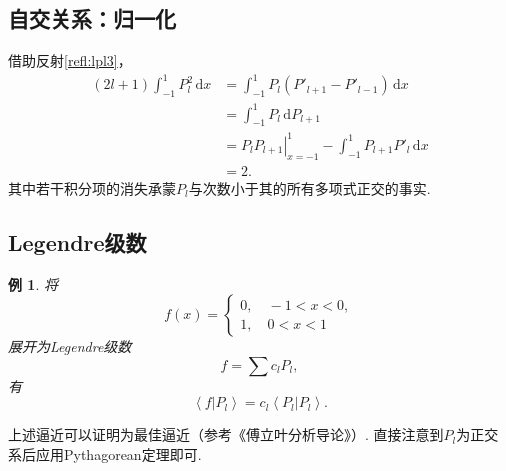\documentclass[UTF-8]{ctexart}
\newcommand{\dr}{\mathrm{d}}
\newcommand{\pare}[1]{\left(#1\right)}
\newcommand{\intab}[4]{\int_{#1}^{#2} #3 \, \dr #4}
\newcommand{\blk}[2]{\left\langle#1\right\vert#2\left.\right\rangle}
\newtheorem{reflection}{反射}
\newcommand{\refl}[1]{\vspace{0.5em}\par\noindent\fbox{%
    \parbox{\textwidth}{%
    \begin{reflection}
        #1
    \end{reflection}
    }%
}\vspace{0.5em}\par}
\newcommand{\rref}[1]{反射\ref{refl:#1}}
\newtheorem{ex}{例}
\begin{document}
  \subsection{自交关系：归一化}
  借助\rref{lpl3}，
  \begin{align*}
    \pare{2l+1}\intab{-1}{1}{P_l^2}{x} &= \intab{-1}{1}{P_l\pare{P'_{l+1}-P'_{l-1}}}{x} \\
    &= \intab{-1}{1}{P_l}{P_{l+1}} \\
    &= \left.P_lP_{l+1}\right\vert_{x=-1}^{1} - \intab{-1}{1}{P_{l+1}P'_l}{x} \\
    &= 2.
  \end{align*}
  其中若干积分项的消失承蒙$P_l$与次数小于其的所有多项式正交的事实.
  \refl{
    \label{refl:PP}
    \[ \intab{-1}{1}{P_lP_m}{x} = \frac{2}{2l+1}\delta_{lm}. \]
  }
  \subsection{Legendre级数}
  \begin{ex}
    将
    \[ 
       f\pare{x} = \begin{cases}
       0, \quad -1<x<0,\\
       1, \quad 0<x<1
       \end{cases}
    \]
    展开为Legendre级数
    \[ f=\sum c_l P_l, \]
    有
    \[ \blk{f}{P_l} = c_l\blk{P_l}{P_l}. \]
  \end{ex}
  \refl{
    对于
    \[ f=\sum c_l P_l, \]
    有
    \[ c_l = \frac{2l+1}{2}\blk{f}{P_l}. \]
  }
  上述逼近可以证明为最佳逼近（参考《傅立叶分析导论》）. 直接注意到$P_l$为正交系后应用Pythagorean定理即可.
\end{document}
